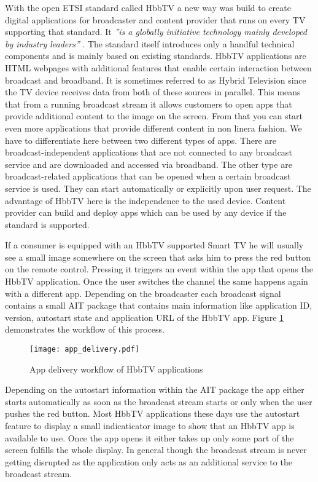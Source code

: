 With the open ETSI standard called HbbTV a new way was build to create digital applications for
broadcaster and content provider that runs on every TV supporting that standard. It \textit{''is
a globally initiative technology mainly developed by industry leaders''} \cite{zte}. The standard
itself introduces only a handful technical components and is mainly based on existing standards. HbbTV
applications are HTML webpages with additional features that enable certain interaction between
broadcast and broadband. It is sometimes referred to as Hybrid Television since the TV device receives
data from both of these sources in parallel. This means that from a running broadcast stream it allows
customers to open apps that provide additional content to the image on the screen. From that you can start
even more applications that provide different content in non linera fashion. We have to differentiate
here between two different types of apps. There are broadcast-independent applications that are not
connected to any broadcast service and are downloaded and accessed via broadband. The other type are
broadcast-related applications that can be opened when a certain broadcast service is used. They
can start automatically or explicitly upon user request. The advantage of HbbTV here is the independence
to the used device. Content provider can build and deploy apps which can be used by any device if the
standard is supported.

If a consumer is equipped with an HbbTV supported Smart TV he will usually see a small image somewhere
on the screen that asks him to press the red button on the remote control. Pressing it triggers an
event within the app that opens the HbbTV application. Once the user switches the channel the same
happens again with a different app. Depending on the broadcaster each broadcast signal contains
a small AIT package that contains main information like application ID, version, autostart state and
application URL of the HbbTV app. Figure \ref{fig:app_delivery} demonstrates the workflow of this
process.

\begin{figure}[htb]
  \centering
  \texttt{[image: app\_delivery.pdf]}\\
  \caption{App delivery workflow of HbbTV applications}\label{fig:app_delivery}
\end{figure}

Depending on the autostart information within the AIT package the app either starts automatically
as soon as the broadcast stream starts or only when the user pushes the red button. Most HbbTV
applications these days use the autostart feature to display a small indicaticator image to
show that an HbbTV app is available to use. Once the app opens it either takes up only some part
of the screen fulfills the whole display. In general though the broadcast stream is never
getting disrupted as the application only acts as an additional service to the broadcast stream.

